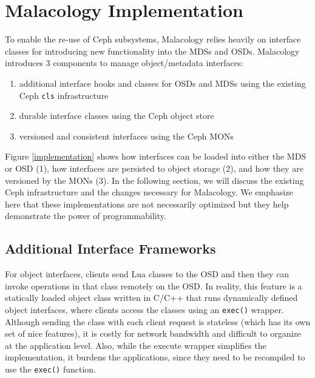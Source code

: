 \documentclass[10pt,twocolumn]{article}
\begin{document}
\section{Malacology Implementation}\label{malacology-implementation}

\label{implementation}

To enable the re-use of Ceph subsystems, Malacology relies heavily on
interface classes for introducing new functionality into the MDSs and
OSDs. Malacology introduces 3 components to manage object/metadata
interfaces:

\begin{enumerate}
\def\labelenumi{\arabic{enumi}.}
\item
  additional interface hooks and classes for OSDs and MDSs using the
  existing Ceph \texttt{cls} infrastructure
\item
  durable interface classes using the Ceph object store
\item
  versioned and consistent interfaces using the Ceph MONs
\end{enumerate}

Figure \ref{implementation} shows how interfaces can be loaded into
either the MDS or OSD (1), how interfaces are persisted to object
storage (2), and how they are versioned by the MONs (3). In the
following section, we will discuss the existing Ceph infrastructure and
the changes necessary for Malacology. We emphasize here that these
implementations are not necessarily optimized but they help demonstrate
the power of programmability.

\subsection{Additional Interface
Frameworks}\label{additional-interface-frameworks}

For object interfaces, clients send Lua classes to the OSD and then they
can invoke operations in that class remotely on the OSD. In reality,
this feature is a statically loaded object class written in C/C++ that
runs dynamically defined object interfaces, where clients access the
classes using an \texttt{exec()} wrapper. Although sending the class
with each client request is stateless (which has its own set of nice
features), it is costly for network bandwidth and difficult to organize
at the application level. Also, while the execute wrapper simplifies the
implementation, it burdens the applications, since they need to be
recompiled to use the \texttt{exec()} function.
\end{document}
